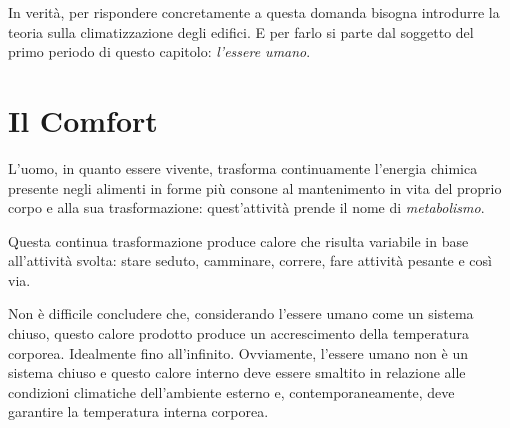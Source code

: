 In verità, per rispondere concretamente a questa domanda bisogna introdurre la teoria sulla climatizzazione degli edifici. E per farlo si parte dal soggetto del primo periodo di questo capitolo: \emph{l'essere umano}.

\section{Il Comfort}
L'uomo, in quanto essere vivente, trasforma continuamente l'energia chimica presente negli alimenti in forme più consone al mantenimento in vita del proprio corpo e alla sua trasformazione: quest'attività prende il nome di \emph{metabolismo}.

Questa continua trasformazione produce calore che risulta variabile in base all'attività svolta: stare seduto, camminare, correre, fare attività pesante e così via.

Non è difficile concludere che, considerando l'essere umano come un sistema chiuso, questo calore prodotto produce un accrescimento della temperatura corporea. Idealmente fino all'infinito. Ovviamente, l'essere umano non è un sistema chiuso e questo calore interno deve essere smaltito in relazione alle condizioni climatiche dell'ambiente esterno e, contemporaneamente, deve garantire la temperatura interna corporea.

